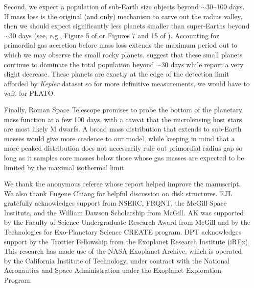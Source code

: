 \documentclass[twocolumn]{aastex631}
\begin{document}
Second, we expect a population of sub-Earth size objects beyond $\sim$30--100 days. If mass loss is the original (and only) mechanism to carve out the radius valley, then we should expect significantly less planets smaller than super-Earths beyond $\sim$30 days (see, e.g., Figure 5 of \citet{Owen17} or Figures 7 and 15 of \citet{Rogers21_pevap}). Accounting for primordial gas accretion before mass loss extends the maximum period out to which we may observe the small rocky planets. \citet{Hsu19} suggest that these small planets continue to dominate the total population beyond $\sim$30 days while \citet{Wilson21} report a very slight decrease. These planets are exactly at the edge of the detection limit afforded by {\it Kepler} dataset so for more definitive measurements, we would have to wait for PLATO. 

Finally, Roman Space Telescope promises to probe the bottom of the planetary mass function at a few 100 days, with a caveat that the microlensing host stars are most likely M dwarfs. A broad mass distribution that extends to sub-Earth masses would give more credence to our model, while keeping in mind that a more peaked distribution does not necessarily rule out primordial radius gap so long as it samples core masses below those whose gas masses are expected to be limited by the maximal isothermal limit.


\begin{acknowledgements}
We thank the anonymous referee whose report helped improve the manuscript. We also thank Eugene Chiang for helpful discussion on disk structures. EJL gratefully acknowledges support from NSERC, FRQNT, the McGill Space Institute, and the William Dawson Scholarship from McGill. AK was supported by the Faculty of Science Undergraduate Research Award from McGill and by the Technologies for Exo-Planetary Science CREATE program. DPT acknowledges support by the Trottier Fellowship from the Exoplanet Research Institute (iREx). This research has made use of the NASA Exoplanet Archive, which is operated by the California Institute of Technology, under contract with the National Aeronautics and Space Administration under the Exoplanet Exploration Program.
\end{acknowledgements}

{}

\end{document}
